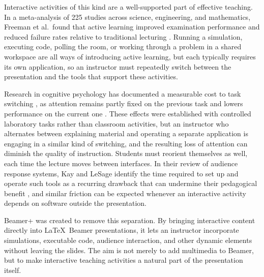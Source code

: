 \documentclass[sigconf]{acmart}
\begin{document}
Interactive activities of this kind are a well-supported part of effective teaching. In a meta-analysis of 225 studies across science, engineering, and mathematics, Freeman et al.\ found that active learning improved examination performance and reduced failure rates relative to traditional lecturing \cite{freeman2014active}. Running a simulation, executing code, polling the room, or working through a problem in a shared workspace are all ways of introducing active learning, but each typically requires its own application, so an instructor must repeatedly switch between the presentation and the tools that support these activities.

Research in cognitive psychology has documented a measurable cost to task switching \cite{monsell2003task}, as attention remains partly fixed on the previous task and lowers performance on the current one \cite{leroy2009attention}. These effects were established with controlled laboratory tasks rather than classroom activities, but an instructor who alternates between explaining material and operating a separate application is engaging in a similar kind of switching, and the resulting loss of attention can diminish the quality of instruction. Students must reorient themselves as well, each time the lecture moves between interfaces. In their review of audience response systems, Kay and LeSage identify the time required to set up and operate such tools as a recurring drawback that can undermine their pedagogical benefit \cite{kay2009audience}, and similar friction can be expected whenever an interactive activity depends on software outside the presentation.

Beamer+ was created to remove this separation. By bringing interactive content directly into \LaTeX\ Beamer presentations, it lets an instructor incorporate simulations, executable code, audience interaction, and other dynamic elements without leaving the slides. The aim is not merely to add multimedia to Beamer, but to make interactive teaching activities a natural part of the presentation itself.
\end{document}
